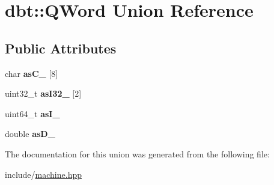 \hypertarget{uniondbt_1_1_q_word}{}\section{dbt\+:\+:Q\+Word Union Reference}
\label{uniondbt_1_1_q_word}
\subsection*{Public Attributes}
\begin{DoxyCompactItemize}
\item 
char {\bfseries as\+C\+\_\+} \mbox{[}8\mbox{]}\hypertarget{uniondbt_1_1_q_word_a98149ad5a98596f8bbb5e2559da82b1f}{}\label{uniondbt_1_1_q_word_a98149ad5a98596f8bbb5e2559da82b1f}

\item 
uint32\+\_\+t {\bfseries as\+I32\+\_\+} \mbox{[}2\mbox{]}\hypertarget{uniondbt_1_1_q_word_a53ad55ff21aaf77540bf71e58e8e17ed}{}\label{uniondbt_1_1_q_word_a53ad55ff21aaf77540bf71e58e8e17ed}

\item 
uint64\+\_\+t {\bfseries as\+I\+\_\+}\hypertarget{uniondbt_1_1_q_word_ab3df10c02555e1257d5847788b62c610}{}\label{uniondbt_1_1_q_word_ab3df10c02555e1257d5847788b62c610}

\item 
double {\bfseries as\+D\+\_\+}\hypertarget{uniondbt_1_1_q_word_a5d00e1c24a268e6b26683a1dd622b42e}{}\label{uniondbt_1_1_q_word_a5d00e1c24a268e6b26683a1dd622b42e}

\end{DoxyCompactItemize}


The documentation for this union was generated from the following file\+:\begin{DoxyCompactItemize}
\item 
include/\hyperlink{machine_8hpp}{machine.\+hpp}\end{DoxyCompactItemize}
